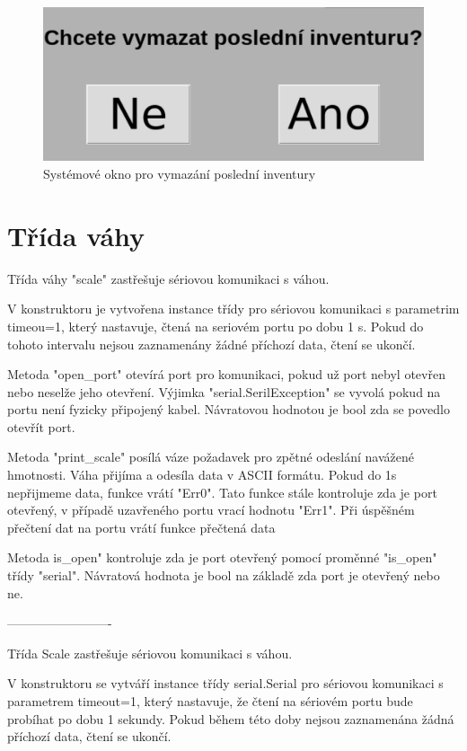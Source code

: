 \begin{figure}[!h]
    \begin{center}
        \includegraphics[scale=0.45]{obrazky/mazani_inventury.PNG}
    \end{center}
    \caption{Systémové okno pro vymazání poslední inventury}
    \label{putty}
\end{figure}

\section{Třída váhy}

Třída váhy "scale" zastřešuje sériovou komunikaci s váhou. 

V konstruktoru je vytvořena instance třídy pro sériovou komunikaci s parametrim timeou=1, který nastavuje, čtená na seriovém portu po dobu 1 s. Pokud do tohoto intervalu nejsou zaznamenány žádné příchozí data, čtení se ukončí. 

Metoda "open\_port" otevírá port pro komunikaci, pokud už port nebyl otevřen nebo neselže jeho otevření. Výjimka "serial.SerilException" se vyvolá pokud na portu není fyzicky připojený kabel. Návratovou hodnotou je bool zda se povedlo otevřít port.

Metoda "print\_scale" posílá váze požadavek pro zpětné odeslání navážené hmotnosti. Váha přijíma a odesíla data v ASCII formátu. Pokud do 1s nepřijmeme data, funkce vrátí "Err0". Tato funkce stále kontroluje zda je port otevřený, v případě uzavřeného portu vrací hodnotu "Err1". Při úspěšném přečtení dat na portu vrátí funkce přečtená data

Metoda is\_open" kontroluje zda je port otevřený pomocí proměnné "is\_open" třídy "serial". Návratová hodnota je bool na základě zda port je otevřený nebo ne.

-------------------------

Třída Scale zastřešuje sériovou komunikaci s váhou.

V konstruktoru se vytváří instance třídy serial.Serial pro sériovou komunikaci s parametrem timeout=1, který nastavuje, že čtení na sériovém portu bude probíhat po dobu 1 sekundy. Pokud během této doby nejsou zaznamenána žádná příchozí data, čtení se ukončí.


